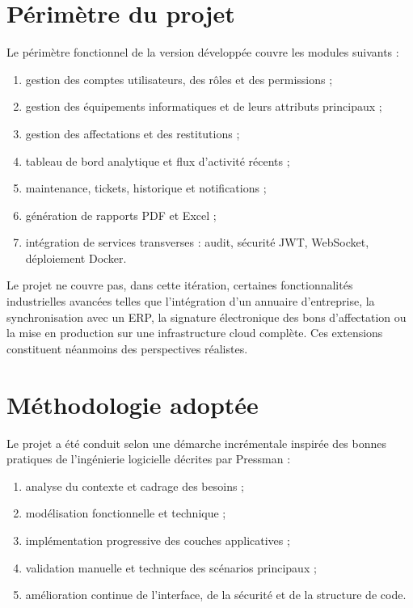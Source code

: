 ﻿\documentclass[12pt,a4paper,oneside]{report}
\begin{document}
\section{Périmètre du projet}
Le périmètre fonctionnel de la version développée couvre les modules suivants :
\begin{enumerate}
  \item gestion des comptes utilisateurs, des rôles et des permissions ;
  \item gestion des équipements informatiques et de leurs attributs principaux ;
  \item gestion des affectations et des restitutions ;
  \item tableau de bord analytique et flux d'activité récents ;
  \item maintenance, tickets, historique et notifications ;
  \item génération de rapports PDF et Excel ;
  \item intégration de services transverses : audit, sécurité JWT, WebSocket, déploiement Docker.
\end{enumerate}

Le projet ne couvre pas, dans cette itération, certaines fonctionnalités industrielles avancées telles que l'intégration d'un annuaire d'entreprise, la synchronisation avec un ERP, la signature électronique des bons d'affectation ou la mise en production sur une infrastructure cloud complète. Ces extensions constituent néanmoins des perspectives réalistes.

\section{Méthodologie adoptée}
Le projet a été conduit selon une démarche incrémentale inspirée des bonnes pratiques de l'ingénierie logicielle décrites par Pressman \cite{pressman2014} :
\begin{enumerate}
  \item analyse du contexte et cadrage des besoins ;
  \item modélisation fonctionnelle et technique ;
  \item implémentation progressive des couches applicatives ;
  \item validation manuelle et technique des scénarios principaux ;
  \item amélioration continue de l'interface, de la sécurité et de la structure de code.
\end{enumerate}
\end{document}
